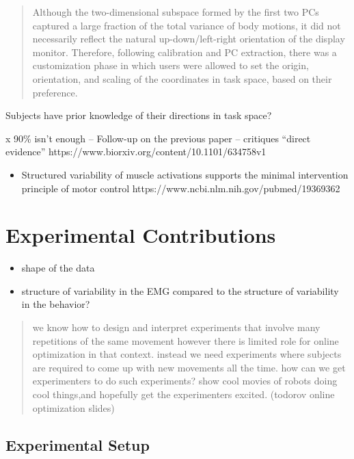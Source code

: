 \documentclass[
  a4paper,
]{article}
\providecommand{\tightlist}{%
  \setlength{\itemsep}{0pt}\setlength{\parskip}{0pt}}
\begin{document}
\begin{quote}
Although the two-dimensional subspace formed by the first two PCs
captured a large fraction of the total variance of body motions, it did
not necessarily reflect the natural up-down/left-right orientation of
the display monitor. Therefore, following calibration and PC extraction,
there was a customization phase in which users were allowed to set the
origin, orientation, and scaling of the coordinates in task space, based
on their preference.
\end{quote}

Subjects have prior knowledge of their directions in task space?

x 90\% isn't enough -- Follow-up on the previous paper -- critiques
``direct evidence'' https://www.biorxiv.org/content/10.1101/634758v1

\begin{itemize}
\tightlist
\item
  Structured variability of muscle activations supports the minimal
  intervention principle of motor control
  https://www.ncbi.nlm.nih.gov/pubmed/19369362
\end{itemize}

\hypertarget{sec:experiment}{%
\section{Experimental Contributions}\label{sec:experiment}}

\begin{itemize}
\tightlist
\item
  shape of the data
\item
  structure of variability in the EMG compared to the structure of
  variability in the behavior?
\end{itemize}

\begin{quote}
we know how to design and interpret experiments that involve many
repetitions of the same movement however there is limited role for
online optimization in that context. instead we need experiments where
subjects are required to come up with new movements all the time. how
can we get experimenters to do such experiments? show cool movies of
robots doing cool things,and hopefully get the experimenters excited.
(todorov online optimization slides)
\end{quote}

\hypertarget{experimental-setup}{%
\subsection{Experimental Setup}\label{experimental-setup}}
\end{document}
